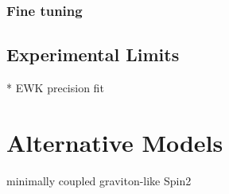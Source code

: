 \subsubsection{Fine tuning}

\subsection{Experimental Limits} 
* EWK precision fit 


\section{Alternative Models} 
minimally coupled graviton-like Spin2
